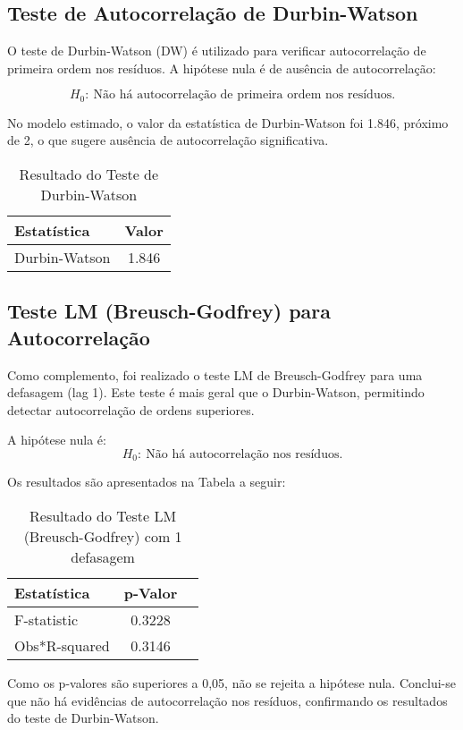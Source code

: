 \documentclass[12pt,oneside]{abntex2}
\begin{document}
\subsection{\textbf{Teste de Autocorrelação de Durbin-Watson}}

O teste de Durbin-Watson (DW) é utilizado para verificar autocorrelação de primeira ordem nos resíduos. 
A hipótese nula é de ausência de autocorrelação:

\[
H_0: \ \text{Não há autocorrelação de primeira ordem nos resíduos.}
\]

No modelo estimado, o valor da estatística de Durbin-Watson foi 1.846, próximo de 2, o que sugere ausência de autocorrelação significativa.

\begin{table}[H]
\centering
\caption{Resultado do Teste de Durbin-Watson}
\begin{tabular}{lc}
\hline
Estatística & Valor \\
\hline
Durbin-Watson & 1.846 \\
\hline
\end{tabular}
\end{table}

\subsection{\textbf{Teste LM (Breusch-Godfrey) para Autocorrelação}}

Como complemento, foi realizado o teste LM de Breusch-Godfrey para uma defasagem (lag 1). Este teste é mais geral que o Durbin-Watson, permitindo detectar autocorrelação de ordens superiores.

A hipótese nula é:
\[
H_0: \ \text{Não há autocorrelação nos resíduos.}
\]

Os resultados são apresentados na Tabela a seguir:

\begin{table}[H]
\centering
\caption{Resultado do Teste LM (Breusch-Godfrey) com 1 defasagem}
\begin{tabular}{lcc}
\hline
Estatística & p-Valor \\
\hline
F-statistic & 0.3228 \\
Obs*R-squared & 0.3146 \\
\hline
\end{tabular}
\end{table}

Como os p-valores são superiores a 0,05, não se rejeita a hipótese nula. Conclui-se que não há evidências de autocorrelação nos resíduos, confirmando os resultados do teste de Durbin-Watson.
\end{document}
